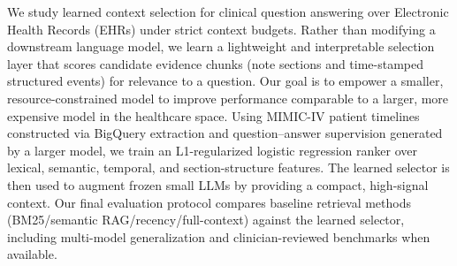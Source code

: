 We study learned context selection for clinical question answering over Electronic Health Records (EHRs) under strict context budgets. Rather than modifying a downstream language model, we learn a lightweight and interpretable selection layer that scores candidate evidence chunks (note sections and time-stamped structured events) for relevance to a question. Our goal is to empower a smaller, resource-constrained model to improve performance comparable to a larger, more expensive model in the healthcare space. Using MIMIC-IV patient timelines constructed via BigQuery extraction and question--answer supervision generated by a larger model, we train an L1-regularized logistic regression ranker over lexical, semantic, temporal, and section-structure features. The learned selector is then used to augment frozen small LLMs by providing a compact, high-signal context. Our final evaluation protocol compares baseline retrieval methods (BM25/semantic RAG/recency/full-context) against the learned selector, including multi-model generalization and clinician-reviewed benchmarks when available.